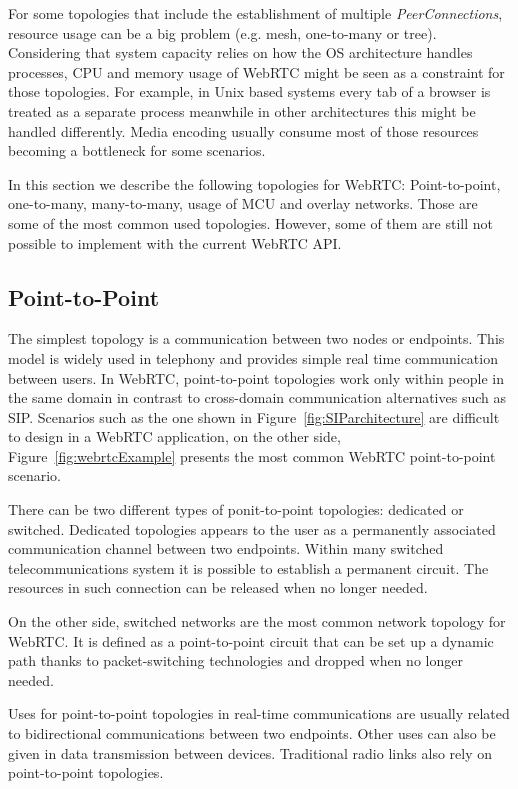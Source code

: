 For some topologies that include the establishment of multiple {\it PeerConnections}, resource usage can be a big problem (e.g. mesh, one-to-many or tree). Considering that system capacity relies on how the OS architecture handles processes, CPU and memory usage of WebRTC might be seen as a constraint for those topologies. For example, in Unix based systems every tab of a browser is treated as a separate process meanwhile in other architectures this might be handled differently. Media encoding usually consume most of those resources becoming a bottleneck for some scenarios.

In this section we describe the following topologies for WebRTC: Point-to-point, one-to-many, many-to-many, usage of MCU and overlay networks. Those are some of the most common used topologies. However, some of them are still not possible to implement with the current WebRTC API.

\subsection{Point-to-Point}

The simplest topology is a communication between two nodes or endpoints. This model is widely used in telephony and provides simple real time communication between users. In WebRTC, point-to-point topologies work only within people in the same domain in contrast to cross-domain communication alternatives such as SIP. Scenarios such as the one shown in Figure~\ref{fig:SIParchitecture} are difficult to design in a WebRTC application, on the other side, Figure~\ref{fig:webrtcExample} presents the most common WebRTC point-to-point scenario.

There can be two different types of ponit-to-point topologies: dedicated or switched. Dedicated topologies appears to the user as a permanently associated communication channel between two endpoints. Within many switched telecommunications system it is possible to establish a permanent circuit. The resources in such connection can be released when no longer needed.

On the other side, switched networks are the most common network topology for WebRTC. It is defined as a point-to-point circuit that can be set up a dynamic path thanks to packet-switching technologies and dropped when no longer needed. 

Uses for point-to-point topologies in real-time communications are usually related to bidirectional communications between two endpoints. Other uses can also be given in data transmission between devices. Traditional radio links also rely on point-to-point topologies.
 
